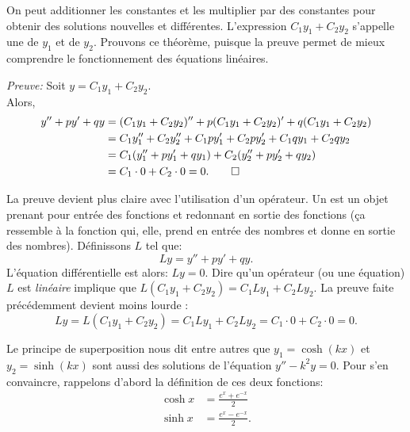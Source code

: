 On peut additionner les constantes et les multiplier par des constantes pour obtenir des solutions nouvelles et différentes.  L'expression $C_1 y_1 + C_2 y_2$ s'appelle une
\emph{} de $y_1$ et de $y_2$.
Prouvons ce théorème, puisque la preuve permet de mieux comprendre le fonctionnement des équations linéaires.

\medskip

\emph{Preuve:}
Soit 
$y = C_1 y_1 + C_2 y_2$. \\
Alors,
\begin{equation*}
\begin{split}
y'' + py' + qy & =
(C_1 y_1 + C_2 y_2)'' + p(C_1 y_1 + C_2 y_2)' + q(C_1 y_1 + C_2 y_2) \\
& = C_1 y_1'' + C_2 y_2'' + C_1 p y_1' + C_2 p y_2' + C_1 q y_1 + C_2 q y_2 \\
& = C_1 ( y_1'' + p y_1' + q y_1 ) + C_2 ( y_2'' + p y_2' + q y_2 ) \\
& = C_1 \cdot 0 + C_2 \cdot 0 = 0 . \qed
\end{split}
\end{equation*}

\medskip

La preuve devient plus claire avec l'utilisation d'un opérateur.
Un \emph{} est un objet prenant pour entrée des fonctions et redonnant en sortie des fonctions (ça ressemble à la fonction qui, elle, prend en entrée des nombres et donne en sortie des nombres).
Définissons $L$ tel que: 
\begin{equation*}
Ly = y'' + py' + qy .
\end{equation*}
L'équation différentielle est alors: $Ly=0$.
Dire qu'un opérateur (ou une équation)
$L$ est  \emph{linéaire} implique que $L(C_1y_1 + C_2y_2) = 
C_1 Ly_1 + C_2 Ly_2$.  La preuve faite précédemment devient moins lourde :
\begin{equation*}
Ly = L(C_1y_1 + C_2y_2) = 
C_1 Ly_1 + C_2 Ly_2 = C_1 \cdot 0 + C_2 \cdot 0 = 0 .
\end{equation*}

\medskip

Le principe de superposition nous dit entre autres que $y_1 = \cosh (kx)$ et $y_2 = \sinh (kx)$ sont aussi des solutions de l'équation $y'' - k^2y = 0$.  Pour s'en convaincre, rappelons d'abord la définition de ces deux fonctions:
\begin{align*}
\cosh x & = \frac{e^x  + e^{-x}}{2} \\
\sinh x  & = \frac{e^x - e^{-x}}{2}.
\end{align*}


